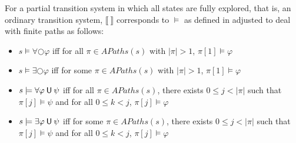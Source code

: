\documentclass[12pt]{article}
\newcommand{\nxt}{\bigcirc}
\newcommand{\until}{\mathbin{\sf U}}
\theoremstyle{definition}
\newcommand{\satisfaction}[1]{\llbracket #1 \rrbracket}
\begin{document}
For a partial transition system in which all states are fully explored, that is, an ordinary transition system, $\satisfaction{\ }$ corresponds to $\models$ as defined in \cite[Definition~6.4]{BK08} adjusted to deal with finite paths as follows:
\begin{itemize}
\item 
$s \models \forall \nxt \varphi$ iff for all $\pi \in \mathit{APaths}(s)$ with $|\pi| > 1$, $\pi[1] \models \varphi$ 
\item
$s \models \exists \nxt \varphi$ iff for some $\pi \in \mathit{APaths}(s)$ with $|\pi| > 1$, $\pi[1] \models \varphi$
\item 
$s \models \forall \varphi \until \psi$ iff for all $\pi \in \mathit{APaths}(s)$, there exists $0 \leq j < |\pi|$ such that $\pi[j] \models \psi$ and for all $0 \leq k < j$, $\pi[j] \models \varphi$
\item
$s \models \exists \varphi \until \psi$ iff for some $\pi \in \mathit{APaths}(s)$, there exists $0 \leq j < |\pi|$ such that $\pi[j] \models \psi$ and for all $0 \leq k < j$, $\pi[j] \models \varphi$
\end{itemize}
\end{document}

